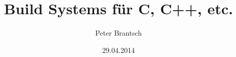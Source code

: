 \begin{frame}
	\title{Build Systems für C, C++, etc.}
	\author{Peter Brantsch}
	\date{29.04.2014}
	\maketitle
\end{frame}
